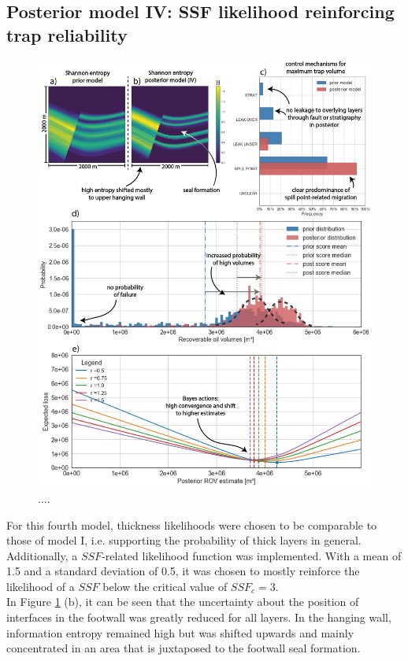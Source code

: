 		\subsection{Posterior model IV: SSF likelihood reinforcing trap reliability}%
		\begin{figure}[p!]
			\centering
			\includegraphics[width=1\textwidth]{Figures/Appendix/ML4}
			\caption{....}\label{fig:ML4}
		\end{figure}
		For this fourth model, thickness likelihoods were chosen to be comparable to those of model I, i.e. supporting the probability of thick layers in general. Additionally, a $SSF$-related likelihood function was implemented. With a mean of 1.5 and a standard deviation of 0.5, it was chosen to mostly reinforce the likelihood of a $SSF$ below the critical value of $SSF_c = 3$.\\
		In Figure \ref{fig:ML4} (b), it can be seen that the uncertainty about the position of interfaces in the footwall was greatly reduced for all layers. In the hanging wall, information entropy remained high but was shifted upwards and mainly concentrated in an area that is juxtaposed to the footwall seal formation.\\
